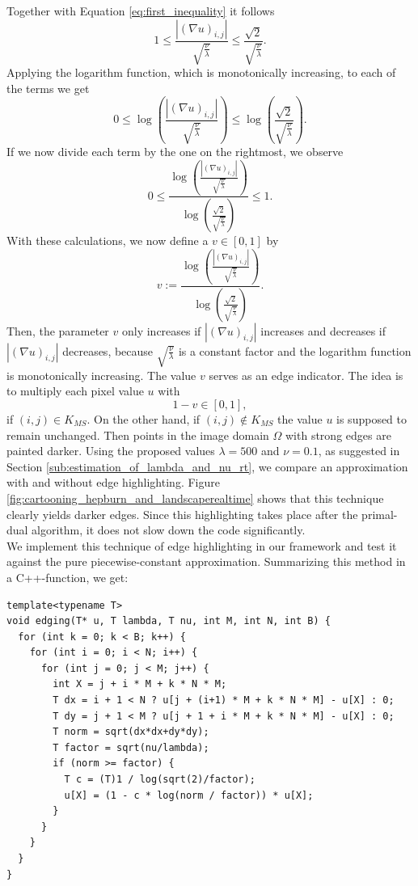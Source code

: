 \documentclass[abstracton]{scrreprt}
\begin{document}
            Together with Equation \ref{eq:first_inequality} it follows
                $$
                    1 \le \frac{|(\nabla u)_{i,j}|}{\sqrt{\frac{\nu}{\lambda}}} \le \frac{\sqrt{2}}{\sqrt{\frac{\nu}{\lambda}}}.
                $$
            Applying the logarithm function, which is monotonically increasing, to each of the terms we get
                $$
                    0 \le \log \left( \frac{|(\nabla u)_{i,j}|}{\sqrt{\frac{\nu}{\lambda}}} \right) \le \log \left( \frac{\sqrt{2}}{\sqrt{\frac{\nu}{\lambda}}} \right).
                $$
            If we now divide each term by the one on the rightmost, we observe
                $$
                    0 \le \frac{\log \left( \frac{|(\nabla u)_{i,j}|}{\sqrt{\frac{\nu}{\lambda}}} \right)}{\log \left( \frac{\sqrt{2}}{\sqrt{\frac{\nu}{\lambda}}} \right)} \le 1.
                $$
            With these calculations, we now define a $v \in [0, 1]$ by
                $$
                    v := \frac{\log \left( \frac{|(\nabla u)_{i,j}|}{\sqrt{\frac{\nu}{\lambda}}} \right)}{\log \left( \frac{\sqrt{2}}{\sqrt{\frac{\nu}{\lambda}}} \right)}.
                $$
            Then, the parameter $v$ only increases if $|(\nabla u)_{i,j}|$ increases and decreases if $|(\nabla u)_{i,j}|$ decreases, because $\sqrt{\frac{\nu}{\lambda}}$ is a constant factor and the logarithm function is monotonically increasing. The value $v$ serves as an edge indicator. The idea is to multiply each pixel value $u$ with
                $$
                    1 - v \in [0, 1],
                $$
            if $(i, j) \in K_{MS}$. On the other hand, if $(i, j) \notin K_{MS}$ the value $u$ is supposed to remain unchanged. Then points in the image domain $\Omega$ with strong edges are painted darker. Using the proposed values $\lambda = 500$ and $\nu = 0.1$, as suggested in Section \ref{sub:estimation_of_lambda_and_nu_rt}, we compare an approximation with and without edge highlighting. Figure \ref{fig:cartooning_hepburn_and_landscaperealtime} shows that this technique clearly yields darker edges. Since this highlighting takes place after the primal-dual algorithm, it does not slow down the code significantly.\\

        We implement this technique of edge highlighting in our framework and test it against the pure piecewise-constant approximation. Summarizing this method in a C++-function, we get:
            \begin{lstlisting}
template<typename T>
void edging(T* u, T lambda, T nu, int M, int N, int B) {
  for (int k = 0; k < B; k++) {
    for (int i = 0; i < N; i++) {
      for (int j = 0; j < M; j++) {
        int X = j + i * M + k * N * M;
        T dx = i + 1 < N ? u[j + (i+1) * M + k * N * M] - u[X] : 0;
        T dy = j + 1 < M ? u[j + 1 + i * M + k * N * M] - u[X] : 0;
        T norm = sqrt(dx*dx+dy*dy);
        T factor = sqrt(nu/lambda);
        if (norm >= factor) {
          T c = (T)1 / log(sqrt(2)/factor);
          u[X] = (1 - c * log(norm / factor)) * u[X];
        }
      }
    }
  }
}
            \end{lstlisting}
        
\end{document}
